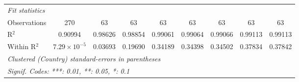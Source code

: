 \begin{table}[htbp]
\begin{tabular}{lcccccccc}
      \midrule
      \emph{Fit statistics}\\
      Observations                                                                     & 270                   & 63       & 63              & 63              & 63              & 63              & 63              & 63\\  
      R$^2$                                                                            & 0.90994               & 0.98626  & 0.98854         & 0.99061         & 0.99064         & 0.99066         & 0.99113         & 0.99113\\  
      Within R$^2$                                                                     & $7.29\times 10^{-5}$  & 0.03693  & 0.19690         & 0.34189         & 0.34398         & 0.34502         & 0.37834         & 0.37842\\  
      \midrule \midrule
      \multicolumn{9}{l}{\emph{Clustered (Country) standard-errors in parentheses}}\\
      \multicolumn{9}{l}{\emph{Signif. Codes: ***: 0.01, **: 0.05, *: 0.1}}\\
   \end{tabular}
\end{table}


